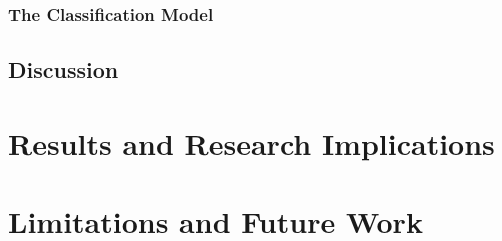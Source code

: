 \subsubsection{The Classification Model}
\label{subsubsec:PenCTClassification}


\subsection{Discussion}
\label{subsec:PenCTDiscussion}



\section{Results and Research Implications}
\label{sec:PenImplications}


\section{Limitations and Future Work}
\label{sec:PenLimitations}
